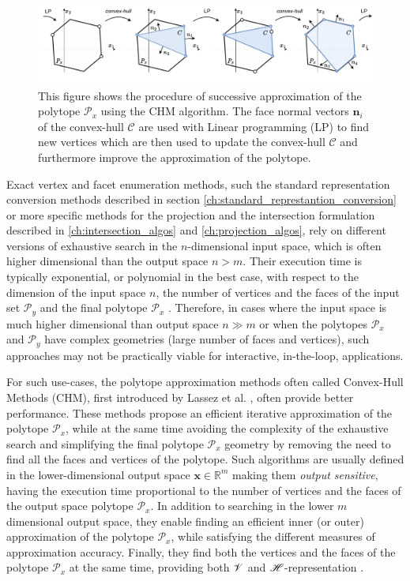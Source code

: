 \begin{figure}[!htb]
    \centering
    \includegraphics[width=\linewidth]{Chapters/imgs/ray_shooting.pdf}
    \caption{This figure shows the procedure of successive approximation of the polytope $\mathcal{P}_x$ using the CHM algorithm. The face normal vectors $\bm{n}_i$ of the convex-hull $\mathcal{C}$ are used with Linear programming (LP) to find new vertices which are then used to update the convex-hull $\mathcal{C}$ and furthermore improve the approximation of the polytope.}
    \label{fig:rsm}
\end{figure}


Exact vertex and facet enumeration methods, such the standard representation conversion methods described in section \ref{ch:standard_represtantion_conversion} or more specific methods for the projection and the intersection formulation described in \ref{ch:intersection_algos} and \ref{ch:projection_algos}, rely on different versions of exhaustive search in the $n$-dimensional input space, which is often higher dimensional than the output space $n> m$. Their execution time is typically exponential, or polynomial in the best case, with respect to the dimension of the input space $n$, the number of vertices and the faces of the input set $\mathcal{P}_y$ and the final polytope $\mathcal{P}_x$ \cite{Dyer1983}. Therefore, in cases where the input space is much higher dimensional than output space $n\gg m$ or when the polytopes $\mathcal{P}_x$ and $\mathcal{P}_y$ have complex geometries (large number of faces and vertices), such approaches may not be practically viable for interactive, in-the-loop, applications. 

For such use-cases, the polytope approximation methods often called Convex-Hull Methods (CHM), first introduced by Lassez et al. \cite{lassez1992quantifier, Huynh2005PracticalIO}, often provide better performance.
These methods propose an efficient iterative approximation of the polytope $\mathcal{P}_x$, while at the same time avoiding the complexity of the exhaustive search and simplifying the final polytope $\mathcal{P}_x$ geometry by removing the need to find all the faces and vertices of the polytope. Such algorithms are usually defined in the lower-dimensional output space $\bm{x}\in \mathbb{R}^m$ making them \textit{output sensitive}, having the execution time proportional to the number of vertices and the faces of the output space polytope $\mathcal{P}_x$. In addition to searching in the lower $m$ dimensional output space, they enable finding an efficient inner (or outer) approximation of the polytope $\mathcal{P}_x$, while satisfying the different measures of approximation accuracy. Finally, they find both the vertices and the faces of the polytope $\mathcal{P}_x$ at the same time, providing both $\mathscr{V}$ and $\mathscr{H}$-representation \cite{Gl_le_2018}.

